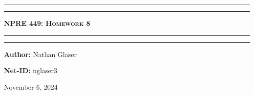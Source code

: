 \documentclass{article}
\begin{document}
\newcommand{\circled}[1]{\tikz[baseline=(char.base)]{
            \node[shape=circle,draw,inner sep=2pt] (char) {#1};}}

\newcommand{\pd}[3]{\frac{\partial^{#3}#1}{\partial {#2}^{#3}}}
\begin{titlepage}

\centering
\scshape
\vspace{\baselineskip}

%
\rule{\textwidth}{1.6pt}\vspace*{-\baselineskip}\vspace*{2pt}
\rule{\textwidth}{0.4pt}

{\Huge \textbf{\textsc{NPRE 449: Homework 8 \\
\vspace{15pt}}}}

\rule{\textwidth}{0.4pt}\vspace*{-\baselineskip}\vspace{3.2pt}
\rule{\textwidth}{1.6pt}\vspace{6pt}
\vspace{1.5\baselineskip}


\large \centerline{\textbf{Author:} Nathan Glaser}
\large \centerline{\textbf{Net-ID:} nglaser3}
\quad

\vfill
\large \centerline{November 6, 2024}
%
\end{titlepage}

\tableofcontents
\newpage
{}
\end{document}
